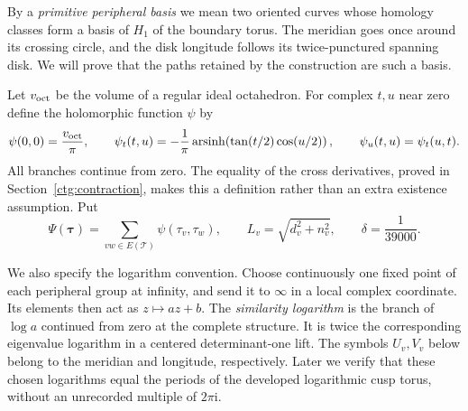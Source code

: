 \documentclass[11pt]{article}
\numberwithin{equation}{section}
\theoremstyle{definition}
\theoremstyle{remark}
\newcommand{\ii}{\mathrm i}
\newcommand{\arsinh}{\operatorname{arsinh}}
\begin{document}
By a \emph{primitive peripheral basis} we mean two oriented curves
whose homology classes form a basis of $H_1$ of the boundary torus.
The meridian goes once around its crossing circle, and the disk
longitude follows its twice-punctured spanning disk. We will prove
that the paths retained by the construction are such a basis.

Let $v_{\rm oct}$ be the volume of a regular ideal octahedron. For
complex $t,u$ near zero define the holomorphic function $\psi$ by
\begin{equation}\label{ctg:psi}
 \psi(0,0)=\frac{v_{\rm oct}}{\pi},\qquad
 \psi_t(t,u)=-\frac1\pi\arsinh\!\left(\tan(t/2)\cos(u/2)\right),
 \qquad \psi_u(t,u)=\psi_t(u,t).
\end{equation}
All branches continue from zero. The equality of the cross derivatives,
proved in Section~\ref{ctg:contraction}, makes this a definition rather
than an extra existence assumption. Put
\[
 \Psi(\boldsymbol\tau)=\sum_{vw\in E(\mathcal T)}\psi(\tau_v,\tau_w),
 \qquad L_v=\sqrt{d_v^2+n_v^2},\qquad \delta=\frac1{39000}.
\]

We also specify the logarithm convention. Choose continuously one
fixed point of each peripheral group at infinity, and send it to
$\infty$ in a local complex coordinate. Its elements then act as
$z\mapsto az+b$. The \emph{similarity logarithm} is the branch of
$\log a$ continued from zero at the complete structure. It is twice
the corresponding eigenvalue logarithm in a centered determinant-one
lift. The symbols $U_v,V_v$ below belong to the meridian and longitude,
respectively. Later we verify that these chosen logarithms equal the
periods of the developed logarithmic cusp torus, without an unrecorded
multiple of $2\pi\ii$.
\end{document}

